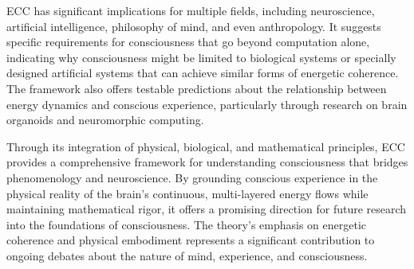 ECC has significant implications for multiple fields, including neuroscience, artificial intelligence, philosophy of mind, and even anthropology. It suggests specific requirements for consciousness that go beyond computation alone, indicating why consciousness might be limited to biological systems or specially designed artificial systems that can achieve similar forms of energetic coherence. The framework also offers testable predictions about the relationship between energy dynamics and conscious experience, particularly through research on brain organoids and neuromorphic computing.

Through its integration of physical, biological, and mathematical principles, ECC provides a comprehensive framework for understanding consciousness that bridges phenomenology and neuroscience. By grounding conscious experience in the physical reality of the brain's continuous, multi-layered energy flows while maintaining mathematical rigor, it offers a promising direction for future research into the foundations of consciousness. The theory's emphasis on energetic coherence and physical embodiment represents a significant contribution to ongoing debates about the nature of mind, experience, and consciousness.